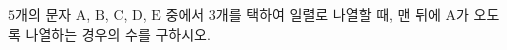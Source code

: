 \hspace*{2mm}\begin{minipage}[t]{\dimexpr\linewidth-2mm\relax}\vspace{0pt}
$5$개의 문자 $\mathrm{A}$, $\mathrm{B}$, $\mathrm{C}$, $\mathrm{D}$, $\mathrm{E}$ 중에서 $3$개를 택하여 일렬로 나열할 때, 맨 뒤에 $\mathrm{A}$가 오도록 나열하는 경우의 수를 구하시오.\end{minipage}
